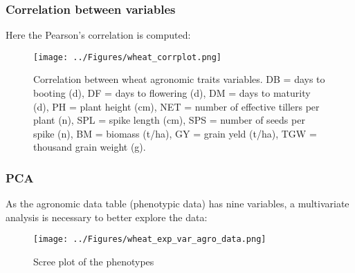 \documentclass[a4paper,onecolumn,10pt]{article}
\begin{document}
\subsubsection{Correlation between variables}

Here the Pearson's correlation is computed:
\begin{figure*}[!Ht]
    \centering
    \texttt{[image: ../Figures/wheat\_corrplot.png]}
    \label{fig:wheat_corr}
    \caption{Correlation between wheat agronomic traits variables.
        DB = days to booting (d),
        DF = days to flowering (d),
        DM = days to maturity (d),
        PH = plant height (cm),
        NET = number of effective tillers per plant (n),
        SPL = spike length (cm),
        SPS = number of seeds per spike (n),
        BM = biomass (t/ha),
        GY = grain yeld (t/ha),
        TGW = thousand grain weight (g).}
\end{figure*}

\subsubsection{PCA}

As the agronomic data table (phenotypic data) has nine variables, a multivariate analysis is necessary to better explore the data:

\begin{figure*}[!Ht]
    \centering
    \texttt{[image: ../Figures/wheat\_exp\_var\_agro\_data.png]}
    \label{fig:wheat_}
    \caption{Scree plot of the phenotypes}
\end{figure*}






\end{document}
